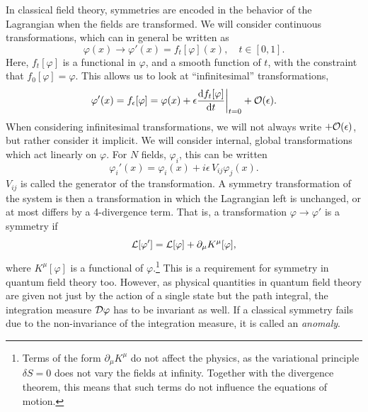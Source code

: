 In classical field theory, symmetries are encoded in the behavior of the Lagrangian when the fields are transformed.
We will consider continuous transformations, which can in general be written as
\begin{equation}
    \varphi(x) \longrightarrow \varphi'(x) = f_t[\varphi](x), \quad t \in [0, 1].
\end{equation}
%
Here, $f_t[\varphi]$ is a functional in $\varphi$, and a smooth function of $t$, with the constraint that $f_0[\varphi] = \varphi$.
This allows us to look at ``infinitesimal'' transformations,
\begin{equation}
    \label{infinitesimal transformation}
    \varphi'(x) = f_\epsilon[\varphi] 
    = \varphi(x) + \epsilon \odv{ f_t[\varphi] }{t}\bigg |_{t=0} + \Oh(\epsilon).
\end{equation}
%
When considering infinitesimal transformations, we will not always write $ + \mathcal O(\epsilon)$, but rather consider it implicit.
We will consider internal, global transformations which act linearly on $\varphi$.
For $N$ fields, $\varphi_i$, this can be written
\begin{equation}
    \label{linear field transformation}
    \varphi_i'(x) = \varphi_i(x) + i \epsilon \, V_{ij} \varphi_j(x).
\end{equation}
%
$V_{ij}$ is called the generator of the transformation.
A symmetry transformation of the system is then a transformation in which the Lagrangian left is unchanged, or at most differs by a 4-divergence term.
That is, a transformation $\varphi \rightarrow \varphi'$ is a symmetry if 
\begin{equation}
    \mathcal{L}[\varphi'] = \mathcal{L}[\varphi] + \partial_\mu K^\mu[\varphi],
\end{equation}
%
where $K^\mu[\varphi]$ is a functional of $\varphi$.\footnote{
    Terms of the form $\partial_\mu K^\mu$ do not affect the physics, as the variational principle $\delta S = 0$ does not vary the fields at infinity. Together with the divergence theorem, this means that such terms do not influence the equations of motion.
    }
This is a requirement for symmetry in quantum field theory too.
However, as physical quantities in quantum field theory are given not just by the action of a single state but the path integral, the integration measure $\mathcal D \varphi$ has to be invariant as well.
If a classical symmetry fails due to the non-invariance of the integration measure, it is called an \emph{anomaly}.

